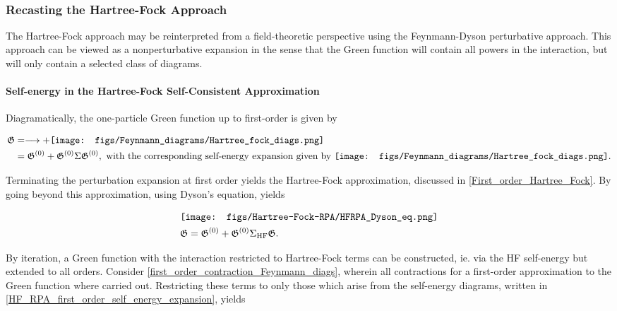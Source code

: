 \blanky \\

\subsubsection{Recasting the Hartree-Fock Approach}

The Hartree-Fock approach may be reinterpreted from a field-theoretic perspective using the Feynmann-Dyson perturbative approach. This approach can be viewed as a nonperturbative expansion in the sense that the Green function will contain all powers in the interaction, but will only contain a selected class of diagrams. \\

\paragraph{Self-energy in the Hartree-Fock Self-Consistent Approximation}

Diagramatically, the one-particle Green function up to first-order is given by 

\begin{equation}
    \begin{split}
        \mathfrak{G} &= \longrightarrow +  \texttt{[image: figs/Feynmann\_diagrams/Hartree\_fock\_diags.png]} \\
        &= \mathfrak{G}^{(0)} + \mathfrak{G}^{(0)} \Sigma \mathfrak{G}^{(0)}, \textnormal{ with the corresponding self-energy expansion given by } \texttt{[image: figs/Feynmann\_diagrams/Hartree\_fock\_diags.png]}.
    \end{split}
    \label{HF_RPA_first_order_self_energy_expansion}
\end{equation}

Terminating the perturbation expansion at first order yields the Hartree-Fock approximation, discussed in \cref{First_order_Hartree_Fock}. By going beyond this approximation, using Dyson's equation, yields 

\begin{equation}
    \begin{split}   
    &\texttt{[image: figs/Hartree-Fock-RPA/HFRPA\_Dyson\_eq.png]} \\
    &\mathfrak{G} = \mathfrak{G}^{(0)} + \mathfrak{G}^{(0)} \Sigma_{\textnormal{HF}}\mathfrak{G}. 
    \end{split}
\end{equation}

By iteration, a Green function with the interaction restricted to Hartree-Fock terms can be constructed, ie. via the HF self-energy but extended to all orders. Consider \cref{first_order_contraction_Feynmann_diags}, wherein all contractions for a first-order approximation to the Green function where carried out. Restricting these terms to only those which arise from the self-energy diagrams, written in 
\cref{HF_RPA_first_order_self_energy_expansion}, yields

